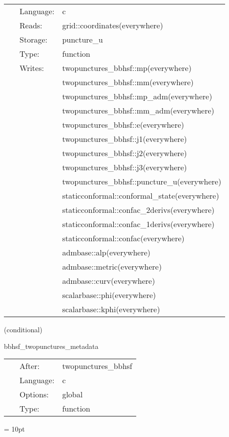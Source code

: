  \begin{tabular*}{160mm}{cll} 
~ & Language:  & c \\ 
~ & Reads:  & grid::coordinates(everywhere) \\ 
~ & Storage:  & puncture\_u \\ 
~ & Type:  & function \\ 
~ & Writes:  & twopunctures\_bbhsf::mp(everywhere) \\ 
~& ~ &twopunctures\_bbhsf::mm(everywhere)\\ 
~& ~ &twopunctures\_bbhsf::mp\_adm(everywhere)\\ 
~& ~ &twopunctures\_bbhsf::mm\_adm(everywhere)\\ 
~& ~ &twopunctures\_bbhsf::e(everywhere)\\ 
~& ~ &twopunctures\_bbhsf::j1(everywhere)\\ 
~& ~ &twopunctures\_bbhsf::j2(everywhere)\\ 
~& ~ &twopunctures\_bbhsf::j3(everywhere)\\ 
~& ~ &twopunctures\_bbhsf::puncture\_u(everywhere)\\ 
~& ~ &staticconformal::conformal\_state(everywhere)\\ 
~& ~ &staticconformal::confac\_2derivs(everywhere)\\ 
~& ~ &staticconformal::confac\_1derivs(everywhere)\\ 
~& ~ &staticconformal::confac(everywhere)\\ 
~& ~ &admbase::alp(everywhere)\\ 
~& ~ &admbase::metric(everywhere)\\ 
~& ~ &admbase::curv(everywhere)\\ 
~& ~ &scalarbase::phi(everywhere)\\ 
~& ~ &scalarbase::kphi(everywhere)\\ 
\end{tabular*} 


\vspace{5mm}

   (conditional) 

\hspace{5mm} bbhsf\_twopunctures\_metadata 

\hspace{5mm}{\it output twopunctures metadata } 


\hspace{5mm}

 \begin{tabular*}{160mm}{cll} 
~ & After:  & twopunctures\_bbhsf \\ 
~ & Language:  & c \\ 
~ & Options:  & global \\ 
~ & Type:  & function \\ 
\end{tabular*} 



\vspace{5mm}\parskip = 10pt 
